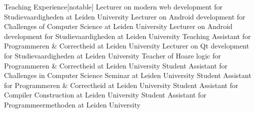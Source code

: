 
\begin{rubric}{Teaching Experience}[notable]
		Lecturer on modern web development for Studievaardigheden at Leiden University
		Lecturer on Android development for Challenges of Computer Science at Leiden University
		Lecturer on Android development for Studievaardigheden at Leiden University
		Teaching Assistant for Programmeren \& Correctheid at Leiden University
		Lecturer on Qt development for Studievaardigheden at Leiden University
		Teacher of Hoare logic for Programmeren \& Correctheid at Leiden University
		Student Assistant for Challenges in Computer Science Seminar at Leiden University
		Student Assistant for Programmeren \& Correctheid at Leiden University
		Student Assistant for Compiler Construction at Leiden University
		Student Assistant for Programmeermethoden at Leiden University
\end{rubric}
